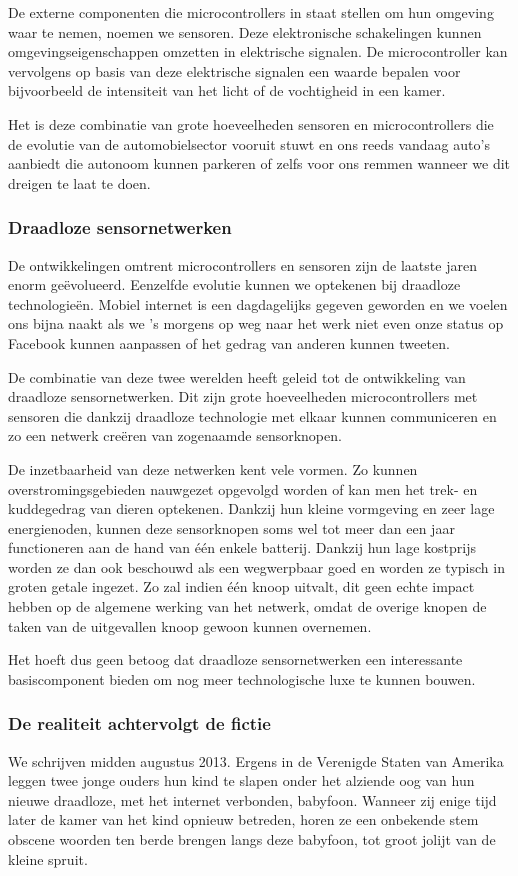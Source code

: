 \documentclass[DIV=calc,paper=a4,fontsize=11pt,twocolumn]{scrartcl}
\newcommand{\heading}[1]{
\vspace{-5mm}
\subsubsection*{#1}
\vspace{-2mm}
}
\begin{document}
De externe componenten die microcontrollers in staat stellen om hun omgeving
waar te nemen, noemen we sensoren. Deze elektronische schakelingen kunnen
omgevingseigenschappen omzetten in elektrische signalen. De microcontroller kan
vervolgens op basis van deze elektrische signalen een waarde bepalen voor
bijvoorbeeld de intensiteit van het licht of de vochtigheid in een kamer.

Het is deze combinatie van grote hoeveelheden sensoren en microcontrollers die
de evolutie van de automobielsector vooruit stuwt en ons reeds vandaag auto's
aanbiedt die autonoom kunnen parkeren of zelfs voor ons remmen wanneer we dit
dreigen te laat te doen.

\heading{Draadloze sensornetwerken}

De ontwikkelingen omtrent microcontrollers en sensoren zijn de laatste jaren
enorm ge\"evolueerd. Eenzelfde evolutie kunnen we optekenen bij draadloze
technologie\"en. Mobiel internet is een dagdagelijks gegeven geworden en we
voelen ons bijna naakt als we 's morgens op weg naar het werk niet even onze
status op Facebook kunnen aanpassen of het gedrag van anderen kunnen tweeten.

De combinatie van deze twee werelden heeft geleid tot de ontwikkeling van
draadloze sensornetwerken. Dit zijn grote hoeveelheden microcontrollers met
sensoren die dankzij draadloze technologie met elkaar kunnen communiceren en zo
een netwerk cre\"eren van zogenaamde sensorknopen.

De inzetbaarheid van deze netwerken kent vele vormen. Zo kunnen
overstromingsgebieden nauwgezet opgevolgd worden of kan men het trek- en
kuddegedrag van dieren optekenen. Dankzij hun kleine vormgeving en zeer lage
energienoden, kunnen deze sensorknopen soms wel tot meer dan een jaar
functioneren aan de hand van \'e\'en enkele batterij. Dankzij hun lage
kostprijs worden ze dan ook beschouwd als een wegwerpbaar goed en worden ze
typisch in groten getale ingezet. Zo zal indien \'e\'en knoop uitvalt, dit geen
echte impact hebben op de algemene werking van het netwerk, omdat de overige
knopen de taken van de uitgevallen knoop gewoon kunnen overnemen.

Het hoeft dus geen betoog dat draadloze sensornetwerken een interessante
basiscomponent bieden om nog meer technologische luxe te kunnen bouwen.

\heading{De realiteit achtervolgt de fictie}

We schrijven midden augustus 2013. Ergens in de Verenigde Staten van Amerika
leggen twee jonge ouders hun kind te slapen onder het alziende oog van hun
nieuwe draadloze, met het internet verbonden, babyfoon. Wanneer zij enige tijd
later de kamer van het kind opnieuw betreden, horen ze een onbekende stem
obscene woorden ten berde brengen langs deze babyfoon, tot groot jolijt van de
kleine spruit.
\end{document}
